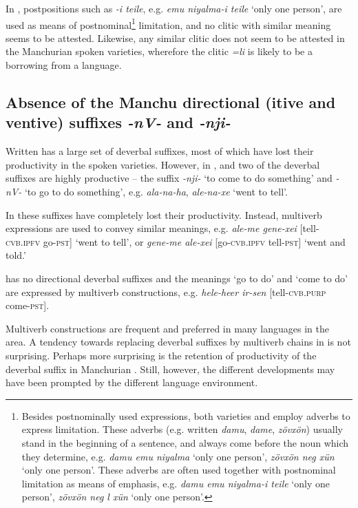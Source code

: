 \documentclass[output=paper,colorlinks,citecolor=brown]{langscibook}
\begin{document}
In , postpositions such as \textit{-i teile}, e.g. \textit{emu niyalma-i teile} ‘only one person’, are used as means of postnominal\footnote{Besides postnominally used expressions, both  varieties and  employ adverbs to express limitation. These adverbs (e.g. written  \textit{damu},  \textit{dame},   \textit{zövxön}) usually stand in the beginning of a sentence, and always come before the noun which they determine, e.g.  \textit{damu emu niyalma} ‘only one person’,  \textit{zövxön neg xün} ‘only one person’. These adverbs are often used together with postnominal limitation as means of emphasis, e.g.  \textit{damu emu niyalma-i teile} ‘only one person’,  \textit{zövxön neg l xün} ‘only one person’.} limitation, and no clitic with similar meaning seems to be attested. Likewise, any similar clitic does not seem to be attested in the Manchurian spoken  varieties, wherefore the  clitic \textit{=li} is likely to be a borrowing from a  language.

\subsection{Absence of the Manchu directional (itive and ventive) suffixes \textit{-nV-} and \textit{-nji-}}

Written  has a large set of deverbal suffixes, most of which have lost their productivity in the spoken varieties. However, in ,  and  two of the deverbal suffixes are highly productive – the suffix \textit{-nji-} ‘to come to do something’ and \textit{-nV-} ‘to go to do something’, e.g.  \textit{ala-na-ha},  \textit{ale-na-xe} ‘went to tell’.

In  these suffixes have completely lost their productivity. Instead, multiverb expressions are used to convey similar meanings, e.g. \textit{ale-me gene-xei} [tell-\textsc{cvb.ipfv} go-\textsc{pst}] ‘went to tell’, or \textit{gene-me ale-xei} [go-\textsc{cvb.ipfv} tell-\textsc{pst}] ‘went and told.’

 has no directional deverbal suffixes and the meanings ‘go to do’ and ‘come to do’ are expressed by multiverb constructions, e.g. \textit{hele-heer ir-sen} [tell-\textsc{cvb.purp} come-\textsc{pst}]. 

Multiverb constructions are frequent and preferred in many languages in the area. A tendency towards replacing deverbal suffixes by multiverb chains in  is not surprising. Perhaps more surprising is the retention of productivity of the deverbal suffix in Manchurian . Still, however, the different developments may have been prompted by the different language environment.
\end{document}
